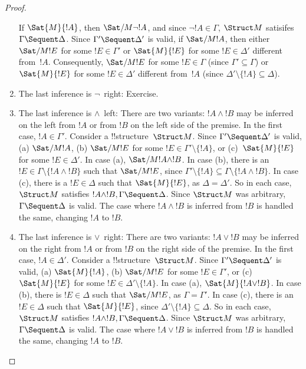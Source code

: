 \documentclass[../../include/open-logic-section]{subfiles}
\begin{document}
\begin{proof}
\begin{enumerate}
  If $\Sat{M}{!A}$, then $\Sat/{M}{\lnot !A}$, and since $\lnot !A
  \in \Gamma$, $\Struct M$ satisifes $\Gamma \Sequent \Delta$.  Since
  $\Gamma' \Sequent \Delta'$ is valid, if $\Sat/{M}{!A}$, then either
  $\Sat/{M}{!E}$ for some $!E \in \Gamma'$ or $\Sat{M}{!E}$ for some
  $!E \in \Delta'$ different from~$!A$. Consequently, $\Sat/{M}{!E}$
  for some $!E \in \Gamma$ (since $\Gamma' \subseteq \Gamma$) or
  $\Sat{M}{!E}$ for some $!E \in \Delta'$ different from~$!A$ (since
  $\Delta' \setminus \{!A\} \subseteq \Delta$).
\item The last inference is $\lnot$~right: Exercise.
\item The last inference is $\land$~left: There are two variants: $!A
  \land !B$ may be inferred on the left from $!A$ or from $!B$ on the
  left side of the premise.  In the first case, $!A \in \Gamma'$.
  Consider a !!{structure}~$\Struct M$. Since $\Gamma' \Sequent
  \Delta'$ is valid, (a) $\Sat/{M}{!A}$, (b) $\Sat/{M}{!E}$ for some
  $!E \in \Gamma' \setminus \{!A\}$, or (c)~$\Sat{M}{!E}$ for some $!E
  \in \Delta'$.  In case (a), $\Sat/{M}{!A \land !B}$. In case (b),
  there is an $!E \in \Gamma \setminus \{!A \land !B\}$ such that
  $\Sat/{M}{!E}$, since $\Gamma' \setminus \{!A\} \subseteq \Gamma
  \setminus \{!A \land !B\}$. In case (c), there is a $!E \in \Delta$
  such that $\Sat{M}{!E}$, as $\Delta = \Delta'$. So in each case,
  $\Struct M$ satisfies $!A \land !B, \Gamma \Sequent \Delta$. Since
  $\Struct M$ was arbitrary, $\Gamma \Sequent \Delta$ is valid. The
  case where $!A \land !B$ is inferred from $!B$ is handled the same,
  changing $!A$ to $!B$.
\item The last inference is $\lor$~right: There are two variants: $!A
  \lor !B$ may be inferred on the right from $!A$ or from $!B$ on the
  right side of the premise.  In the first case, $!A \in \Delta'$.
  Consider a !!{structure}~$\Struct M$. Since $\Gamma' \Sequent
  \Delta'$ is valid, (a) $\Sat{M}{!A}$, (b) $\Sat/{M}{!E}$ for some
  $!E \in \Gamma'$, or (c)~$\Sat{M}{!E}$ for some $!E \in \Delta'
  \setminus \{!A\}$.  In case (a), $\Sat{M}{!A \lor !B}$. In case (b),
  there is $!E \in \Delta$ such that $\Sat/{M}{!E}$, as $\Gamma =
  \Gamma'$. In case (c), there is an $!E \in \Delta$ such that
  $\Sat{M}{!E}$, since $\Delta' \setminus \{!A\} \subseteq \Delta$. So
  in each case, $\Struct M$ satisfies $!A \land !B, \Gamma \Sequent
  \Delta$. Since $\Struct M$ was arbitrary, $\Gamma \Sequent \Delta$
  is valid. The case where $!A \lor !B$ is inferred from $!B$ is
  handled the same, changing $!A$ to $!B$.

\end{enumerate}
\end{proof}
\end{document}
